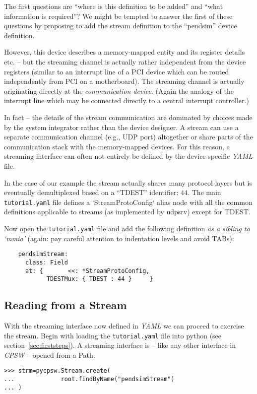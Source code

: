 \documentclass[10pt]{article}
\newcommand{\ita}[1]{\emph{#1}}
\newcommand{\cpsw}      {\ita {CPSW}}
\newcommand{\yaml}      {\ita {YAML}}
\newcommand{\Path}      {{Path}}
\newcommand{\py}        {python}
\newcommand{\udps}      {udpsrv}
\newcommand{\cod}[1] {{\tt#1}}
\newcommand{\tutyaml} {\cod{tutorial.yaml}}
\begin{document}
The first questions are ``where is this definition to be added'' and ``what
information is required''? We might be tempted to answer the first of these questions
by proposing to add the stream definition to the ``pendsim'' device definition.

However, this device describes a memory-mapped entity and its register details
etc. -- but the streaming channel is actually rather independent from the device
registers (similar to an interrupt line of a PCI device which can be routed
independently from PCI on a motherboard). The streaming channel is actually
originating directly at the {\em communication device}. (Again the analogy of
the interrupt line which may be connected directly to a central interrupt controller.)

In fact -- the details of the stream communication are dominated by choices made
by the system integrator rather than the device designer. A stream can use a separate
communication channel (e.g., UDP port) altogether or share parts of the communication
stack with the memory-mapped devices. For this reason, a streaming interface can
often not entirely be defined by the device-specific \yaml{} file.

In the case of our example the stream actually shares many protocol layers but
is eventually demultiplexed based on a ``TDEST'' identifier: $44$. The main \tutyaml{}
file defines a `StreamProtoConfig` alias node with all the common definitions
applicable to streams (as implemented by \udps{}) except for TDEST.

Now open the \tutyaml{} file and add the following definition {\em as a sibling to
`mmio'} (again: pay careful attention to indentation levels and avoid TABs):
\begin{verbatim}
    pendsimStream:
      class: Field
      at: {       <<: *StreamProtoConfig,
            TDESTMux: { TDEST : 44 }     }
\end{verbatim}

\subsection{Reading from a Stream}
With the streaming interface now defined in \yaml{} we can proceed to exercise
the stream.  Begin with loading the \tutyaml{} file into \py{} (see
section~\ref{sec:firststeps}).  A streaming interface is -- like any other interface
in \cpsw{} -- opened from a \Path{}:
\begin{verbatim}
>>> strm=pycpsw.Stream.create(
...             root.findByName("pendsimStream")
... )
\end{verbatim}
\end{document}
